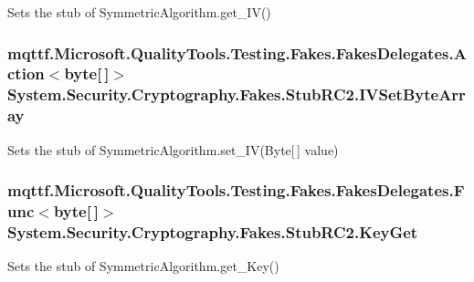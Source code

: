 Sets the stub of Symmetric\-Algorithm.\-get\-\_\-\-I\-V()

\hypertarget{class_system_1_1_security_1_1_cryptography_1_1_fakes_1_1_stub_r_c2_afb32f67ca67afd4171ad4143cc65c063}{
\subsubsection[{I\-V\-Set\-Byte\-Array}]{\setlength{\rightskip}{0pt plus 5cm}mqttf.\-Microsoft.\-Quality\-Tools.\-Testing.\-Fakes.\-Fakes\-Delegates.\-Action$<$byte\mbox{[}$\,$\mbox{]}$>$ System.\-Security.\-Cryptography.\-Fakes.\-Stub\-R\-C2.\-I\-V\-Set\-Byte\-Array}}\label{class_system_1_1_security_1_1_cryptography_1_1_fakes_1_1_stub_r_c2_afb32f67ca67afd4171ad4143cc65c063}


Sets the stub of Symmetric\-Algorithm.\-set\-\_\-\-I\-V(\-Byte\mbox{[}$\,$\mbox{]} value)

\hypertarget{class_system_1_1_security_1_1_cryptography_1_1_fakes_1_1_stub_r_c2_a0d17c95a2be98d7354bc4ee03b4ee3bd}{
\subsubsection[{Key\-Get}]{\setlength{\rightskip}{0pt plus 5cm}mqttf.\-Microsoft.\-Quality\-Tools.\-Testing.\-Fakes.\-Fakes\-Delegates.\-Func$<$byte\mbox{[}$\,$\mbox{]}$>$ System.\-Security.\-Cryptography.\-Fakes.\-Stub\-R\-C2.\-Key\-Get}}\label{class_system_1_1_security_1_1_cryptography_1_1_fakes_1_1_stub_r_c2_a0d17c95a2be98d7354bc4ee03b4ee3bd}


Sets the stub of Symmetric\-Algorithm.\-get\-\_\-\-Key()

